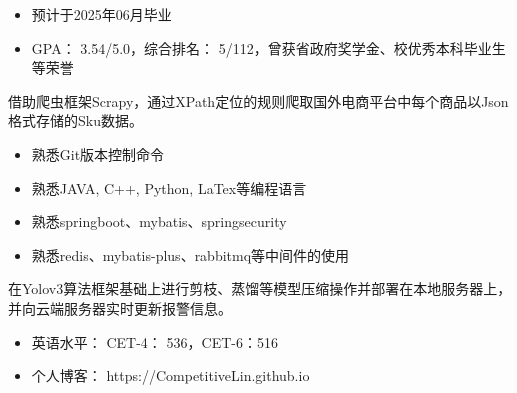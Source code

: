 


	






\begin{itemize}
	\item 预计于2025年06月毕业
\end{itemize}

\begin{itemize}
	\item GPA： 3.54/5.0，综合排名： 5/112，曾获省政府奖学金、校优秀本科毕业生等荣誉
\end{itemize}


借助爬虫框架Scrapy，通过XPath定位的规则爬取国外电商平台中每个商品以Json格式存储的Sku数据。


\begin{itemize}
	\item 熟悉Git版本控制命令
	\item 熟悉JAVA, C++, Python, LaTex等编程语言
	\item 熟悉springboot、mybatis、springsecurity
	\item 熟悉redis、mybatis-plus、rabbitmq等中间件的使用
\end{itemize}

\vspace{-3mm}


在Yolov3算法框架基础上进行剪枝、蒸馏等模型压缩操作并部署在本地服务器上，并向云端服务器实时更新报警信息。


\begin{itemize}	
	\item 英语水平： CET-4： 536，CET-6：516
	\item 个人博客： https://CompetitiveLin.github.io
\end{itemize}


